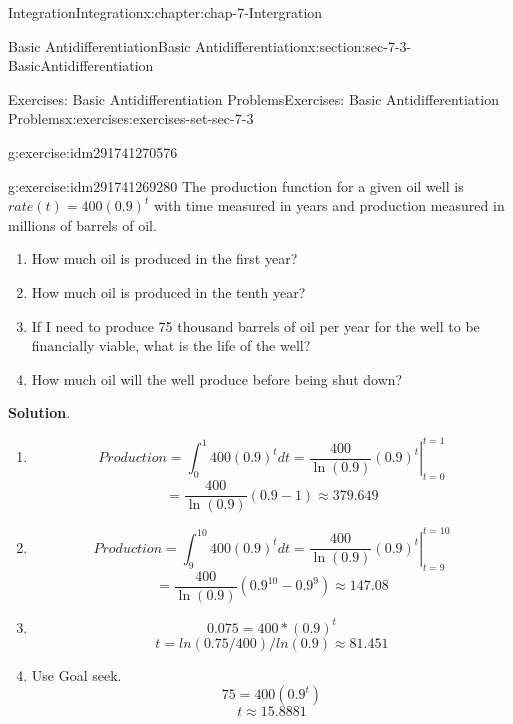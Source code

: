 \documentclass[oneside,10pt,]{book}
\numberwithin{equation}{section}
\begin{document}
\begin{chapterptx}{Integration}{}{Integration}{}{}{x:chapter:chap-7-Intergration}
\begin{sectionptx}{Basic Antidifferentiation}{}{Basic Antidifferentiation}{}{}{x:section:sec-7-3-BasicAntidifferentiation}
\begin{exercises-subsection}{Exercises: Basic Antidifferentiation Problems}{}{Exercises: Basic Antidifferentiation Problems}{}{}{x:exercises:exercises-set-sec-7-3}
\begin{divisionexercise}{20}{}{}{g:exercise:idm291741270576}
\end{divisionexercise}%
\begin{divisionexercise}{21}{}{}{g:exercise:idm291741269280}%
The production function for a given oil well is \(rate(t) = 400(0.9)^t\) with time measured in years and production measured in millions of barrels of oil.%
%
\begin{enumerate}[label=(\alph*)]
\item{}How much oil is produced in the first year?%
\item{}How much oil is produced in the tenth year?%
\item{}If I need to produce 75 thousand barrels of oil per year for the well to be financially viable, what is the life of the well?%
\item{}How much oil will the well produce before being shut down?%
\end{enumerate}
\par\smallskip%
\noindent\textbf{Solution}.\hypertarget{g:solution:idm291741264992}{}\quad{}%
\begin{enumerate}[label=(\alph*)]
\item{}%
\begin{equation*}
Production=\int_0^{1}400(0.9)^t dt
=\left.\frac{400}{\ln(0.9)}  (0.9)^t \right|_{t=0}^{t=1}
\end{equation*}
%
\begin{equation*}
=\frac{400}{\ln(0.9)} (0.9-1)\approx 379.649
\end{equation*}
%
\item{}%
\begin{equation*}
Production=\int_9^{10}400(0.9)^t dt
=\left.\frac{400}{\ln(0.9)}  (0.9)^t \right|_{t=9}^{t=10}
\end{equation*}
%
\begin{equation*}
=\frac{400}{\ln(0.9)} (0.9^{10}-0.9^{9})\approx 147.08
\end{equation*}
%
\item{}%
\begin{equation*}
0.075=400*(0.9)^t
\end{equation*}
%
\begin{equation*}
t=ln(0.75/400)/ln(0.9)\approx 81.451
\end{equation*}
%
\item{}Use Goal seek.%
%
\begin{equation*}
75=400(0.9^t)
\end{equation*}
%
\begin{equation*}
t\approx 15.8881
\end{equation*}

\end{enumerate}
\end{divisionexercise}
\end{exercises-subsection}
\end{sectionptx}
\end{chapterptx}
\end{document}
